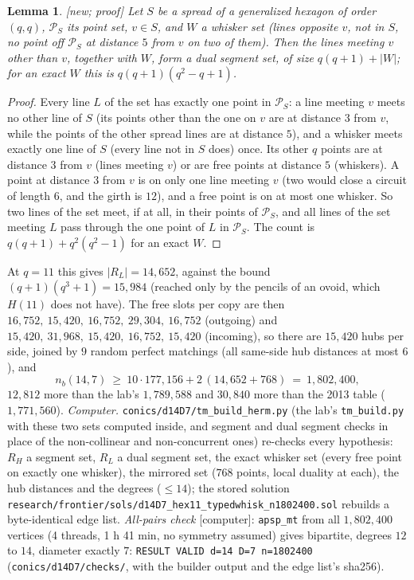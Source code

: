 \documentclass[11pt]{amsart}
\newtheorem{lemma}[theorem]{Lemma}
\theoremstyle{definition}
\theoremstyle{remark}
\newcommand{\status}[1]{\textup{[#1]}}
\begin{document}
\begin{lemma}\label{lem:whiskRL}
\status{new; proof} Let $S$ be a spread of a generalized hexagon of order $(q,q)$, $\mathcal P_S$ its point set,
$v\in S$, and $W$ a whisker set (lines opposite $v$, not in $S$, no point off $\mathcal P_S$ at distance $5$ from $v$
on two of them). Then the lines meeting $v$ other than $v$, together with $W$, form a dual segment set, of size
$q(q+1)+|W|$; for an exact $W$ this is $q(q+1)(q^2-q+1)$.
\end{lemma}
\begin{proof}
Every line $L$ of the set has exactly one point in $\mathcal P_S$: a line meeting $v$ meets no other line of $S$ (its
points other than the one on $v$ are at distance $3$ from $v$, while the points of the other spread lines are at
distance $5$), and a whisker meets exactly one line of $S$ (every line not in $S$ does) once. Its other $q$ points are
at distance $3$ from $v$ (lines meeting $v$) or are free points at distance $5$ (whiskers). A point at distance $3$
from $v$ is on only one line meeting $v$ (two would close a circuit of length $6$, and the girth is $12$), and a free point is on at
most one whisker. So two lines of the set meet, if at all, in their points of $\mathcal P_S$, and all lines of the set
meeting $L$ pass through the one point of $L$ in $\mathcal P_S$. The count is $q(q+1)+q^2(q^2-1)$ for an exact $W$.
\end{proof}

At $q=11$ this gives $|R_L|=14{,}652$, against the bound $(q+1)(q^3+1)=15{,}984$ (reached only by the pencils of an
ovoid, which $H(11)$ does not have). The free slots per copy are then $16{,}752,\ 15{,}420,\ 16{,}752,\ 29{,}304,\
16{,}752$ (outgoing) and $15{,}420,\ 31{,}968,\ 15{,}420,\ 16{,}752,\ 15{,}420$ (incoming), so there are $15{,}420$ hubs per
side, joined by $9$ random perfect matchings (all same-side hub distances at most $6$), and
$$n_b(14,7)\ \ge\ 10\cdot177{,}156+2\,(14{,}652+768)\ =\ 1{,}802{,}400,$$
$12{,}812$ more than the lab's $1{,}789{,}588$ and $30{,}840$ more than the 2013 table ($1{,}771{,}560$).
\emph{Computer.} \texttt{conics/d14D7/tm\_build\_herm.py} (the lab's \texttt{tm\_build.py} with these two sets
computed inside, and segment and dual segment checks in place of the non-collinear and non-concurrent ones) re-checks
every hypothesis: $R_H$ a segment set, $R_L$ a dual segment set, the exact whisker set (every free point on exactly one
whisker), the mirrored set ($768$ points, local duality at each), the hub distances and the degrees ($\le14$); the stored
solution \texttt{research/frontier/sols/d14D7\_hex11\_typedwhisk\_n1802400.sol} rebuilds a byte-identical edge list.
\emph{All-pairs check} \status{computer}: \texttt{apsp\_mt} from all $1{,}802{,}400$ vertices (4 threads, 1 h 41 min, no
symmetry assumed) gives bipartite, degrees $12$ to $14$, diameter exactly $7$: \texttt{RESULT VALID d=14 D=7
n=1802400} (\texttt{conics/d14D7/checks/}, with the builder output and the edge list's sha256).
\end{document}
